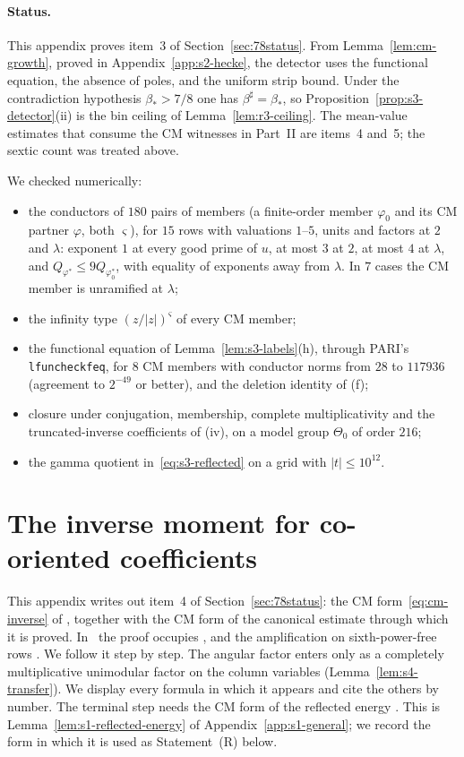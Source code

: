 \documentclass[11pt]{article}
\numberwithin{equation}{section}
\begin{document}
\paragraph{Status.} This appendix proves item~3 of Section~\ref{sec:78status}. From Lemma~\ref{lem:cm-growth},
proved in Appendix~\ref{app:s2-hecke}, the detector uses the functional equation, the absence of poles, and the
uniform strip bound. Under the contradiction hypothesis $\beta_*>7/8$ one has $\beta^\sharp=\beta_*$, so
Proposition~\ref{prop:s3-detector}(ii) is the bin ceiling of Lemma~\ref{lem:r3-ceiling}. The mean-value estimates that consume the CM witnesses in Part~II are items~4
and~5; the sextic count was treated above.

We checked numerically:
\begin{itemize}
\item the conductors of $180$ pairs of members (a finite-order member $\varphi_0$ and its CM partner
 $\varphi$, both $\varsigma$), for $15$ rows with valuations
 $1$--$5$, units and factors at $2$ and $\lambda$: exponent $1$ at every good prime of $u$, at most $3$
 at $2$, at most $4$ at $\lambda$, and $Q_{\varphi^*}\le9Q_{\varphi_0^*}$, with equality of exponents away from
 $\lambda$. In $7$ cases the CM member is unramified at $\lambda$;
\item the infinity type $(z/|z|)^\varsigma$ of every CM member;
\item the functional equation of Lemma~\ref{lem:s3-labels}(h), through PARI's~\cite{PARI} \texttt{lfuncheckfeq}, for
 $8$ CM members with conductor norms from $28$ to $117936$ (agreement to $2^{-49}$ or better), and the deletion
 identity of (f);
\item closure under conjugation, membership, complete multiplicativity and the truncated-inverse
 coefficients of (iv), on a model group $\Theta_0$ of order $216$;
\item the gamma quotient in~\eqref{eq:s3-reflected} on a grid with $|t|\le10^{12}$.
\end{itemize}

\section{The inverse moment for co-oriented coefficients}\label{sec:s4-inverse}

This appendix writes out item~4 of Section~\ref{sec:78status}: the CM form~\eqref{eq:cm-inverse} of
\cite[Lemma~17.1]{OAI78}, together with the CM form of the canonical estimate
\cite[Lemma~17.2]{OAI78} through which it is proved. In~\cite{OAI78} the proof
occupies \cite[Section~17]{OAI78}, and the amplification on sixth-power-free rows \cite[Section~17.7]{OAI78}. We follow it step
by step. The angular factor enters only as a completely multiplicative unimodular factor on the column
variables (Lemma~\ref{lem:s4-transfer}). We display every formula in which it appears and cite the
others by number. The terminal step needs the CM form of the reflected energy
\cite[Lemma~14.3]{OAI78}. This is Lemma~\ref{lem:s1-reflected-energy} of
Appendix~\ref{app:s1-general}; we record the form in which it is used as Statement~(R) below.
\end{document}
